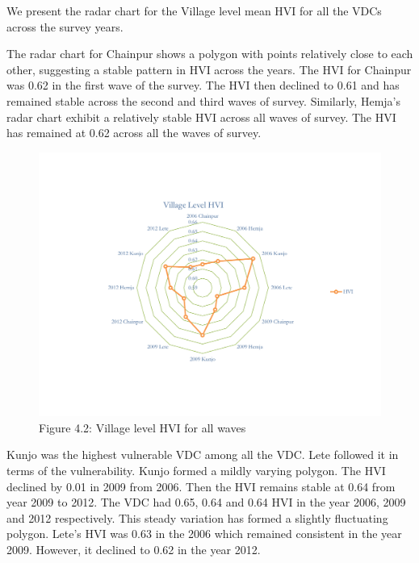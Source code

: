 We present the radar chart for the Village level mean HVI for all the VDCs across the survey years.

The radar chart for Chainpur shows a polygon with points relatively close to each other, suggesting a stable pattern in HVI across the years. The HVI for Chainpur was 0.62 in the first wave of the survey. The HVI then declined to 0.61 and has remained stable across the second and third waves of survey. Similarly, Hemja's radar chart exhibit a relatively stable HVI across all waves of survey. The HVI has remained at 0.62 across all the waves of survey. \vspace{-1.5cm}
\begin{center}
	\begin{figure}[H]
		\includegraphics[scale=0.62]{Graphs and figures/HVI_Summary_VDC.pdf}
		\vspace{-1.5cm}
		\captionsetup{labelformat=empty}
		\caption{Figure 4.2: Village level HVI for all waves} 
		\label{fig:vdclevelhvi}
		\setlength{\belowcaptionskip}{6pt}
		\label{fig:conceptualfw}
	\end{figure}
\end{center}
\vspace{-0.5cm}
Kunjo was the highest vulnerable VDC among all the VDC. Lete followed it in terms of the vulnerability. Kunjo formed a mildly varying polygon. The HVI declined by 0.01 in 2009 from 2006. Then the HVI remains stable at 0.64 from year 2009 to 2012. The VDC had 0.65, 0.64 and 0.64 HVI in the year 2006, 2009 and 2012 respectively. This steady variation has formed a slightly fluctuating polygon.  Lete's HVI was 0.63 in the 2006 which remained consistent in the year 2009. However, it declined to 0.62 in the year 2012.   
